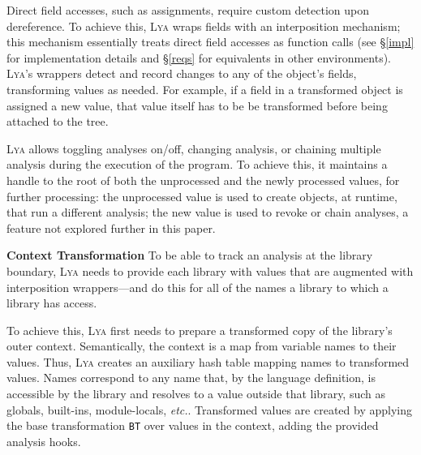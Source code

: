 \documentclass[letterpaper,twocolumn,10pt]{article}
\def\etc{{\em etc.}\xspace}
\newcommand{\heading}[1]{\vspace{2pt}\noindent\textbf{#1}\enspace}
\newcommand{\ttt}[1]{\texttt{#1}}
\newcommand{\sys}{{\scshape Lya}\xspace}
\newcommand{\fixme}[1]{{\color{red}#1}}
\begin{document}
Direct field accesses, such as assignments, require custom detection upon dereference.
To achieve this, \sys wraps fields with an interposition mechanism;
  this mechanism essentially treats direct field accesses as function calls (see \S\ref{impl} for implementation details and \S\ref{reqs} for equivalents in other environments).
\sys's wrappers detect and record changes to any of the object's fields, transforming values as needed.
For example, if a field in a transformed object is assigned a new value, that value itself has to be be transformed before being attached to the \fixme{tree}.

\sys allows toggling analyses on/off, changing analysis, or chaining multiple analysis during the execution of the program.
To achieve this, it maintains a handle to the root of both the unprocessed and the newly processed values, for further processing:
  the unprocessed value is used to create objects, at runtime, that run a different analysis;
  the new value is used to revoke or chain analyses, a feature not explored further in this paper.

\heading{Context Transformation}
To be able to track an analysis at the library boundary, \sys needs to provide each library with values that are augmented with interposition wrappers---and do this for all of the names a library to which a library has access.

To achieve this, \sys first needs to prepare a transformed copy of the library's outer context.
Semantically, the context is a map from variable names to their values.
Thus, \sys creates an auxiliary hash table mapping names to transformed values.
Names correspond to any name that, by the language definition, is accessible by the library and resolves to a value outside that library, such as globals, built-ins, module-locals, \etc.
Transformed values are created by applying the base transformation \ttt{BT} over values in the context, adding the provided analysis hooks.

\end{document}
